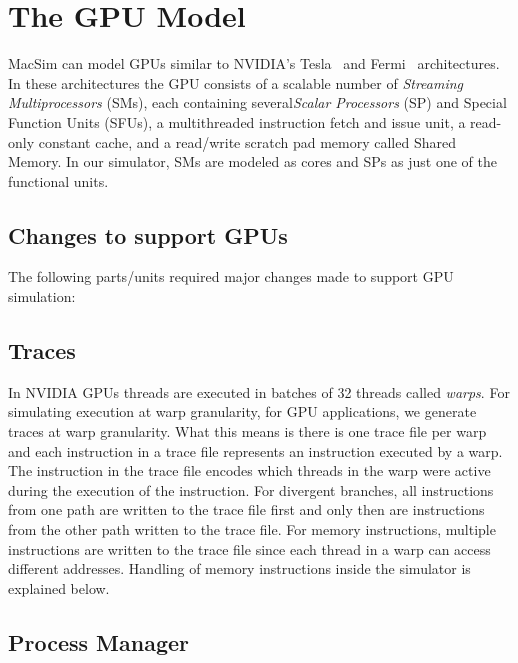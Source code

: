 
\clearpage
\section{The GPU Model}

MacSim can model GPUs similar to NVIDIA's Tesla~\cite{lin:nic08} and
Fermi~\cite{fermi} architectures.  In these architectures the GPU consists of a
scalable number of {\em Streaming Multiprocessors} (SMs), each containing
several{\em Scalar Processors} (SP) and Special Function Units (SFUs), a
multithreaded instruction fetch and issue unit, a read-only constant cache, and
a read/write scratch pad memory called Shared Memory.  In our simulator, SMs
are modeled as cores and SPs as just one of the functional units. 




\subsection{Changes to support GPUs}

The following parts/units required major changes made to support GPU simulation:

\subsection{Traces}

In NVIDIA GPUs threads are executed in batches of 32 threads called
\textit{warps}. For simulating execution at warp granularity, for GPU
applications, we generate traces at warp granularity. What this means is there
is one trace file per warp and each instruction in a trace file represents an
instruction executed by a warp. The instruction in the trace file encodes which
threads in the warp were active during the execution of the instruction. For
divergent branches, all instructions from one path are written to the trace
file first and only then are instructions from the other path written to the
trace file. For memory instructions, multiple instructions are written to the
trace file since each thread in a warp can access different addresses. Handling
of memory instructions inside the simulator is explained below.

\subsection{Process Manager}

